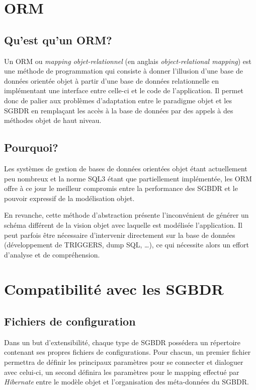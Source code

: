 \section{ORM}

	\subsection{Qu'est qu'un ORM?}
    Un ORM ou \emph{mapping objet-relationnel} (en anglais \emph{object-relational mapping}) est une méthode de programmation qui consiste à donner l'illusion d'une base de données orientée objet à partir d'une base de données relationnelle en implémentant une interface entre celle-ci et le code de l'application. Il permet donc de palier aux problèmes d'adaptation entre le paradigme objet et les SGBDR en remplaçant les accès à la base de données par des appels à des méthodes objet de haut niveau.
   
	\subsection{Pourquoi?}
    Les systèmes de gestion de bases de données orientées objet étant actuellement peu nombreux et la norme SQL3 étant que partiellement implémentée, les ORM offre à ce jour le meilleur compromis entre la performance des SGBDR et le pouvoir expressif de la modélisation objet.
    
En revanche, cette méthode d'abstraction présente l'inconvénient de générer un schéma différent de la vision objet avec laquelle est modélisée l'application. Il peut parfois être nécessaire d'intervenir directement sur la base de données (développement de TRIGGERS, dump SQL, \ldots), ce qui nécessite alors un effort d'analyse et de compréhension.

\section{Compatibilité avec les SGBDR}
	\subsection{Fichiers de configuration}
	Dans un but d'extensibilité, chaque type de SGBDR possédera un répertoire contenant ses propres fichiers de configurations. Pour chacun, un premier fichier permettra de définir les principaux paramètres pour se connecter et dialoguer avec celui-ci, un second définira les paramètres pour le mapping effectué par \emph{Hibernate} entre le modèle objet et l'organisation des méta-données du SGBDR.

